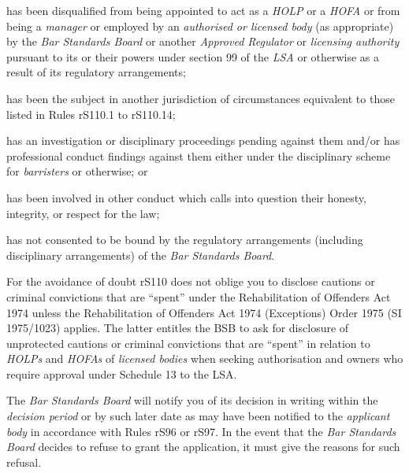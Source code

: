 \item has been disqualified from being appointed to act as a \emph{HOLP}
or a \emph{HOFA} or from being a \emph{manager} or employed by an
\emph{authorised or licensed body} (as appropriate) by the \emph{Bar
Standards Board} or another \emph{Approved Regulator} or \emph{licensing
authority} pursuant to its or their powers under section 99 of the
\emph{LSA} or otherwise as a result of its regulatory arrangements;\item has been the subject in another jurisdiction of circumstances
equivalent to those listed in Rules rS110.1 to rS110.14;\item has an investigation or disciplinary proceedings pending against
them and/or has professional conduct findings against them either under
the disciplinary scheme for \emph{barristers} or otherwise; or\item has been involved in other conduct which calls into question their
honesty, integrity, or respect for the law;
\item has not consented to be bound by the regulatory arrangements
(including disciplinary arrangements) of the \emph{Bar Standards Board}.
\ln




For the avoidance of doubt rS110 does not oblige you to disclose
cautions or criminal convictions that are ``spent'' under the
Rehabilitation of Offenders Act 1974 unless the Rehabilitation of
Offenders Act 1974 (Exceptions) Order 1975 (SI 1975/1023) applies. The
latter entitles the BSB to ask for disclosure of unprotected cautions or
criminal convictions that are ``spent'' in relation to \emph{HOLPs} and
\emph{HOFAs} of \emph{licensed bodies} when seeking authorisation and
owners who require approval under Schedule 13 to the LSA.




The \emph{Bar Standards Board} will notify you of its decision in
writing within the \emph{decision period} or by such later date as may
have been notified to the \emph{applicant body} in accordance with Rules
rS96 or rS97. In the event that the \emph{Bar Standards Board} decides
to refuse to grant the application, it must give the reasons for such
refusal.




